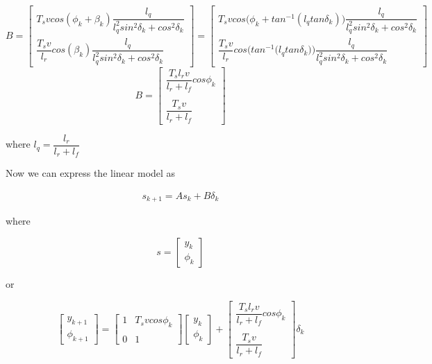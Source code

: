 \begin{equation}
 B =
  \begin{bmatrix}
    T_s v cos(\phi_k + \beta_k) \dfrac{l_q}{l_q^2 sin^2\delta_k + cos^2\delta_k} \\
    \dfrac{T_s v}{l_r} cos(\beta_k) \dfrac{l_q}{l_q^2 sin^2\delta_k + cos^2\delta_k}
  \end{bmatrix}
  =
  \begin{bmatrix}
    T_s v cos\Big(\phi_k + tan^{-1} (l_q tan\delta_k)\Big) \dfrac{l_q}{l_q^2 sin^2\delta_k + cos^2\delta_k} \\
    \dfrac{T_s v}{l_r} cos\Bigg(tan^{-1} \Big(l_q tan\delta_k\Big)\Bigg) \dfrac{l_q}{l_q^2 sin^2\delta_k + cos^2\delta_k}
  \end{bmatrix}
\end{equation}
\begin{equation}
 B =
  \begin{bmatrix}
    \dfrac{T_s l_r v}{l_r + l_f} cos\phi_k \\\\
    \dfrac{T_s v}{l_r+l_f}
  \end{bmatrix}
\end{equation}

where $l_q = \dfrac{l_r}{l_r + l_f}$




Now we can express the linear model as

\begin{align}
  s_{k+1} = A s_k + B \delta_k
\end{align}

where

\begin{equation}
  s=
  \begin{bmatrix}
    y_{k} \\
    \phi_{k}
  \end{bmatrix}
\end{equation}

or

\begin{equation}
  \begin{bmatrix}
    y_{k+1} \\
    \phi_{k+1}
  \end{bmatrix}
  =
  \begin{bmatrix}
    1 & T_s v cos\phi_k \\\\
    0 & 1
  \end{bmatrix}
  \begin{bmatrix}
    y_{k} \\
    \phi_{k}
  \end{bmatrix}
  +
  \begin{bmatrix}
    \dfrac{T_s l_r v}{l_r + l_f} cos\phi_k \\\\
    \dfrac{T_s v}{l_r+l_f}
  \end{bmatrix}
  \delta_{k}
\end{equation}


